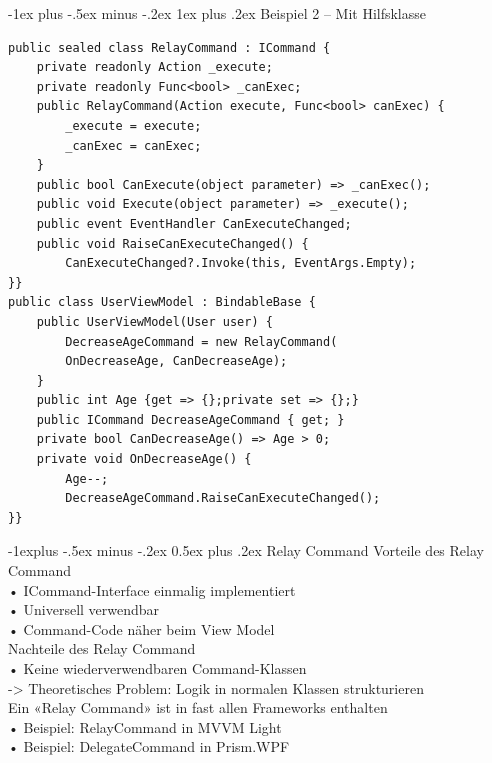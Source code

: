 \documentclass[10pt,landscape,a4paper]{article}
\makeatletter
\renewcommand{\subsection}{\@startsection{subsection}{2}{0mm}%
                                {-1explus -.5ex minus -.2ex}%
                                {0.5ex plus .2ex}%
                                {\normalfont\small\bfseries}}
\renewcommand{\subsubsection}{\@startsection{subsubsection}{3}{0mm}%
                                {-1ex plus -.5ex minus -.2ex}%
                                {1ex plus .2ex}%
                                {\normalfont\footnotesize\bfseries}}
\makeatother
\begin{document}
\begin{multicols*}{3}
\subsubsection{Beispiel 2 – Mit Hilfsklasse}
\begin{verbatim}
public sealed class RelayCommand : ICommand {
    private readonly Action _execute;
    private readonly Func<bool> _canExec;
    public RelayCommand(Action execute, Func<bool> canExec) {
        _execute = execute;
        _canExec = canExec;
    }
    public bool CanExecute(object parameter) => _canExec();
    public void Execute(object parameter) => _execute();
    public event EventHandler CanExecuteChanged;
    public void RaiseCanExecuteChanged() {
        CanExecuteChanged?.Invoke(this, EventArgs.Empty);
}}
public class UserViewModel : BindableBase {
    public UserViewModel(User user) {
        DecreaseAgeCommand = new RelayCommand(
        OnDecreaseAge, CanDecreaseAge);
    }
    public int Age {get => {};private set => {};}
    public ICommand DecreaseAgeCommand { get; }
    private bool CanDecreaseAge() => Age > 0;
    private void OnDecreaseAge() {
        Age--;
        DecreaseAgeCommand.RaiseCanExecuteChanged();
}}
\end{verbatim}
\subsection{Relay Command}
Vorteile des Relay Command\\
• ICommand-Interface einmalig implementiert\\
• Universell verwendbar\\
• Command-Code näher beim View Model\\
Nachteile des Relay Command\\
• Keine wiederverwendbaren Command-Klassen\\
-> Theoretisches Problem: Logik in normalen Klassen strukturieren\\
Ein «Relay Command» ist in fast allen Frameworks enthalten\\
• Beispiel: RelayCommand in MVVM Light\\
• Beispiel: DelegateCommand in Prism.WPF\\


\end{multicols*}
\end{document}

